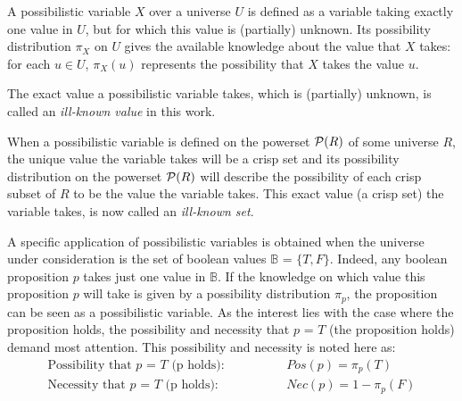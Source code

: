 \begin{definition}
A possibilistic variable $X$ over a universe $U$ is defined as a variable taking exactly one value in $U$, but for which this value is (partially) unknown. Its possibility distribution $\pi_X$ on $U$ gives the available knowledge about the value that $X$ takes: for each $u\in U$, $\pi_X(u)$ represents the possibility that $X$ takes the value $u$.
\end{definition}

The exact value a possibilistic variable takes, which is (partially) unknown, is called an \emph{ill-known value} in this work\cite{Dubois88b}.

When a possibilistic variable is defined on the powerset $\mathcal{P}(R)$ of some universe $R$, the unique value the variable takes will be a crisp set and its possibility distribution on the powerset $\mathcal{P}(R)$ will describe the possibility of each crisp subset of $R$ to be the value the variable takes. This exact value (a crisp set) the variable takes, is now called an \emph{ill-known set}\cite{Dubois88b}.



A specific application of possibilistic variables is obtained when the universe under consideration is the set of boolean values $\mathbb{B}$ = $\{T,F\}$. Indeed, any boolean proposition $p$ takes just one value in $\mathbb{B}$. If the knowledge on which value this proposition $p$ will take is given by a possibility distribution $\pi_p$, the proposition can be seen as a possibilistic variable. As the interest lies with the case where the proposition holds, the possibility and necessity that $p$ = $T$ (the proposition holds) demand most attention. This possibility and necessity is noted here as:
\begin{align}
\text{Possibility that $p$ = $T$ (p holds):} \hspace{50pt} & Pos(p) = \pi_p(T) \label{propholdsposs} \\
\text{Necessity that $p$ = $T$ (p holds):} \hspace{50pt} & Nec(p) = 1-\pi_p(F) \label{propholdsnecc}
\end{align}


